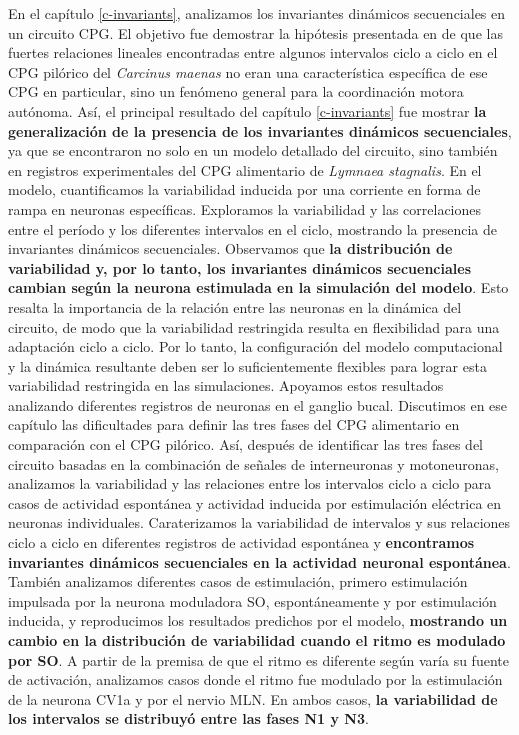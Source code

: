 En el capítulo \ref{c-invariants}, analizamos los invariantes dinámicos secuenciales en un circuito CPG. El objetivo fue demostrar la hipótesis presentada en \textcite{elices_robust_2019} de que las fuertes relaciones lineales encontradas entre algunos intervalos ciclo a ciclo en el CPG pilórico del \textit{Carcinus maenas} no eran una característica específica de ese CPG en particular, sino un fenómeno general para la coordinación motora autónoma. Así, el principal resultado del capítulo \ref{c-invariants} fue mostrar \textbf{la generalización de la presencia de los invariantes dinámicos secuenciales}, ya que se encontraron no solo en un modelo detallado del circuito, sino también en registros experimentales del CPG alimentario de \textit{Lymnaea stagnalis}. En el modelo, cuantificamos la variabilidad inducida por una corriente en forma de rampa en neuronas específicas. Exploramos la variabilidad y las correlaciones entre el período y los diferentes intervalos en el ciclo, mostrando la presencia de invariantes dinámicos secuenciales. Observamos que \textbf{la distribución de variabilidad y, por lo tanto, los invariantes dinámicos secuenciales cambian según la neurona estimulada en la simulación del modelo}. Esto resalta la importancia de la relación entre las neuronas en la dinámica del circuito, de modo que la variabilidad restringida resulta en flexibilidad para una adaptación ciclo a ciclo. Por lo tanto, la configuración del modelo computacional y la dinámica resultante deben ser lo suficientemente flexibles para lograr esta variabilidad restringida en las simulaciones. Apoyamos estos resultados analizando diferentes registros de neuronas en el ganglio bucal. Discutimos en ese capítulo las dificultades para definir las tres fases del CPG alimentario en comparación con el CPG pilórico. Así, después de identificar las tres fases del circuito basadas en la combinación de señales de interneuronas y motoneuronas, analizamos la variabilidad y las relaciones entre los intervalos ciclo a ciclo para casos de actividad espontánea y actividad inducida por estimulación eléctrica en neuronas individuales. Caraterizamos la variabilidad de intervalos y sus relaciones ciclo a ciclo en diferentes registros de actividad espontánea y \textbf{encontramos invariantes dinámicos secuenciales en la actividad neuronal espontánea}. También analizamos diferentes casos de estimulación, primero estimulación impulsada por la neurona moduladora SO, espontáneamente y por estimulación inducida, y reproducimos los resultados predichos por el modelo, \textbf{mostrando un cambio en la distribución de variabilidad cuando el ritmo es modulado por SO}. A partir de la premisa de que el ritmo es diferente según varía su fuente de activación, analizamos casos donde el ritmo fue modulado por la estimulación de la neurona CV1a y por el nervio MLN. En ambos casos, \textbf{la variabilidad de los intervalos se distribuyó entre las fases N1 y N3}.

